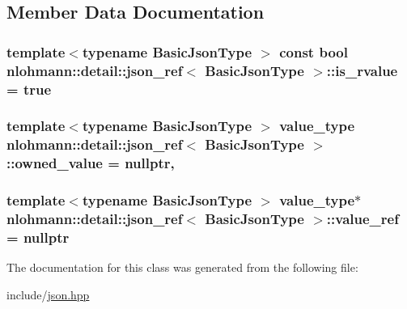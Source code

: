 \subsection{Member Data Documentation}
\subsubsection[{\texorpdfstring{is\+\_\+rvalue}{is_rvalue}}]{\setlength{\rightskip}{0pt plus 5cm}template$<$typename Basic\+Json\+Type $>$ const bool {\bf nlohmann\+::detail\+::json\+\_\+ref}$<$ Basic\+Json\+Type $>$\+::is\+\_\+rvalue = true\hspace{0.3cm}{\ttfamily [private]}}\hypertarget{classnlohmann_1_1detail_1_1json__ref_a434d1e18c21cc1b61954ba22b62ee7a5}{}\label{classnlohmann_1_1detail_1_1json__ref_a434d1e18c21cc1b61954ba22b62ee7a5}
\subsubsection[{\texorpdfstring{owned\+\_\+value}{owned_value}}]{\setlength{\rightskip}{0pt plus 5cm}template$<$typename Basic\+Json\+Type $>$ {\bf value\+\_\+type} {\bf nlohmann\+::detail\+::json\+\_\+ref}$<$ Basic\+Json\+Type $>$\+::owned\+\_\+value = nullptr\hspace{0.3cm}{\ttfamily [mutable]}, {\ttfamily [private]}}\hypertarget{classnlohmann_1_1detail_1_1json__ref_a5d7bd67a5ab713d9be1e248cf9d509cd}{}\label{classnlohmann_1_1detail_1_1json__ref_a5d7bd67a5ab713d9be1e248cf9d509cd}
\subsubsection[{\texorpdfstring{value\+\_\+ref}{value_ref}}]{\setlength{\rightskip}{0pt plus 5cm}template$<$typename Basic\+Json\+Type $>$ {\bf value\+\_\+type}$\ast$ {\bf nlohmann\+::detail\+::json\+\_\+ref}$<$ Basic\+Json\+Type $>$\+::value\+\_\+ref = nullptr\hspace{0.3cm}{\ttfamily [private]}}\hypertarget{classnlohmann_1_1detail_1_1json__ref_a23504615c2076070d5e087443bb376a4}{}\label{classnlohmann_1_1detail_1_1json__ref_a23504615c2076070d5e087443bb376a4}


The documentation for this class was generated from the following file\+:\begin{DoxyCompactItemize}
\item 
include/\hyperlink{json_8hpp}{json.\+hpp}\end{DoxyCompactItemize}
